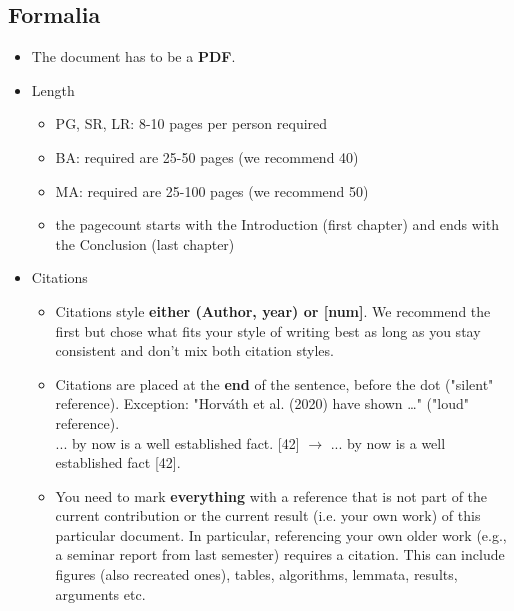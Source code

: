 \documentclass[logo, twocolumn]{mlai-report}
\newcommand{\cmark}{\textcolor[rgb]{0,0.9,0}{\ding{52}}}%
\newcommand{\xmark}{\textcolor[rgb]{0.9,0,0}{\ding{56}}}%
\newcommand{\eg}[2]{ \xmark #1 $\rightarrow$ \cmark #2}
\begin{document}
\subsection{Formalia}
\begin{itemize}

	\item The document has to be a \textbf{PDF}.

	\item Length
	\begin{itemize}
		\item PG, SR, LR: 8-10 pages per person required
		\item BA: required are 25-50 pages (we recommend 40)
		\item MA: required are 25-100 pages (we recommend 50)
		\item the pagecount starts with the Introduction (first chapter) and ends with the Conclusion (last chapter)
	\end{itemize}

	\item Citations
	\begin{itemize}
		\item Citations style \textbf{either (Author, year) or [num]}. We recommend the first but chose what fits your style of writing best as long as you stay consistent and don't mix both citation styles.
		\item Citations are placed at the \textbf{end} of the sentence, before the dot ("silent" reference). Exception: "Horv\'ath et al. (2020) have shown \dots" ("loud" reference).\\
		\eg{... by now is a well established fact. [42]}{... by now is a well established fact [42].}
		\item You need to mark \textbf{everything} with a reference that is not part of the current contribution or the current result (i.e. your own work) of this particular document. In particular, referencing your own older work (e.g., a seminar report from last semester) requires a citation. This can include figures (also recreated ones), tables, algorithms, lemmata, results, arguments etc.
	\end{itemize}


\end{itemize}
\end{document}
